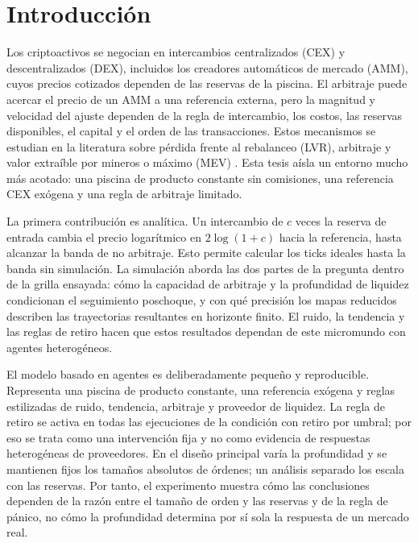 \chapter{Introducción}
\label{cap:introduccion}

Los criptoactivos se negocian en intercambios centralizados (CEX) y descentralizados (DEX), incluidos los creadores automáticos de mercado (AMM), cuyos precios cotizados dependen de las reservas de la piscina. El arbitraje puede acercar el precio de un AMM a una referencia externa, pero la magnitud y velocidad del ajuste dependen de la regla de intercambio, los costos, las reservas disponibles, el capital y el orden de las transacciones. Estos mecanismos se estudian en la literatura sobre pérdida frente al rebalanceo (LVR), arbitraje y valor extraíble por mineros o máximo (MEV) \cite{milionis2022lvr,daian2020flash,zhou2021hft}. Esta tesis aísla un entorno mucho más acotado: una piscina de producto constante sin comisiones, una referencia CEX exógena y una regla de arbitraje limitado.

La primera contribución es analítica. Un intercambio de $c$ veces la reserva de entrada cambia el precio logarítmico en $2\log(1+c)$ hacia la referencia, hasta alcanzar la banda de no arbitraje. Esto permite calcular los ticks ideales hasta la banda sin simulación. La simulación aborda las dos partes de la pregunta dentro de la grilla ensayada: cómo la capacidad de arbitraje y la profundidad de liquidez condicionan el seguimiento poschoque, y con qué precisión los mapas reducidos describen las trayectorias resultantes en horizonte finito. El ruido, la tendencia y las reglas de retiro hacen que estos resultados dependan de este micromundo con agentes heterogéneos.

El modelo basado en agentes es deliberadamente pequeño y reproducible. Representa una piscina de producto constante, una referencia exógena y reglas estilizadas de ruido, tendencia, arbitraje y proveedor de liquidez. La regla de retiro se activa en todas las ejecuciones de la condición con retiro por umbral; por eso se trata como una intervención fija y no como evidencia de respuestas heterogéneas de proveedores. En el diseño principal varía la profundidad y se mantienen fijos los tamaños absolutos de órdenes; un análisis separado los escala con las reservas. Por tanto, el experimento muestra cómo las conclusiones dependen de la razón entre el tamaño de orden y las reservas y de la regla de pánico, no cómo la profundidad determina por sí sola la respuesta de un mercado real.

